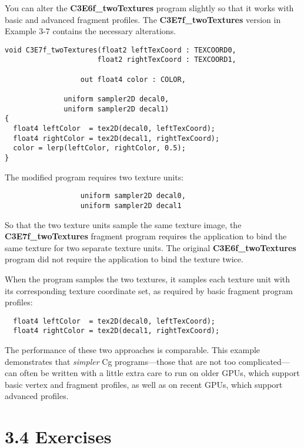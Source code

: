 \documentclass[../main.tex]{subfiles}
\begin{document}
You can alter the \textbf{C3E6f_twoTextures} program slightly so that it works with basic and advanced fragment profiles. The \textbf{C3E7f_twoTextures} version in Example 3-7 contains the necessary alterations.

\FloatBarrier
\begin{lstlisting}[caption=Example 3-7. The \textbf{C3E7f_twoTextures} Fragment Program]
void C3E7f_twoTextures(float2 leftTexCoord : TEXCOORD0,
                      float2 rightTexCoord : TEXCOORD1,

                  out float4 color : COLOR,

              uniform sampler2D decal0,
              uniform sampler2D decal1)
{
  float4 leftColor  = tex2D(decal0, leftTexCoord);
  float4 rightColor = tex2D(decal1, rightTexCoord);
  color = lerp(leftColor, rightColor, 0.5);
}
\end{lstlisting}
\FloatBarrier

The modified program requires two texture units:

\FloatBarrier
\begin{lstlisting}                  
                  uniform sampler2D decal0,
                  uniform sampler2D decal1
\end{lstlisting}
\FloatBarrier

So that the two texture units sample the same texture image, the \textbf{C3E7f_twoTextures} fragment program requires the application to bind the same texture for two separate texture units. The original \textbf{C3E6f_twoTextures} program did not require the application to bind the texture twice.

When the program samples the two textures, it samples each texture unit with its corresponding texture coordinate set, as required by basic fragment program profiles:

\FloatBarrier
\begin{lstlisting} 
  float4 leftColor  = tex2D(decal0, leftTexCoord);
  float4 rightColor = tex2D(decal1, rightTexCoord);
\end{lstlisting}
\FloatBarrier

The performance of these two approaches is comparable. This example demonstrates that \textit{simpler} Cg programs—those that are not too complicated—can often be written with a little extra care to run on older GPUs, which support basic vertex and fragment profiles, as well as on recent GPUs, which support advanced profiles.

\section{3.4 Exercises}
\end{document}
